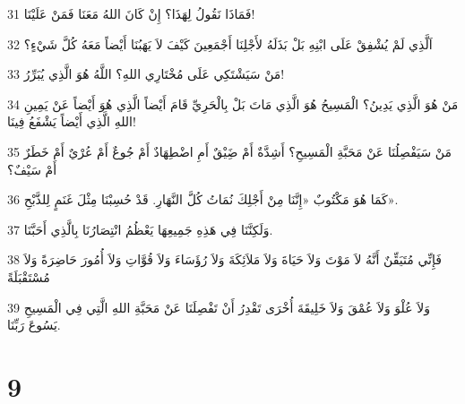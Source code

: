 \par 31 فَمَاذَا نَقُولُ لِهَذَا؟ إِنْ كَانَ اللهُ مَعَنَا فَمَنْ عَلَيْنَا!
\par 32 اَلَّذِي لَمْ يُشْفِقْ عَلَى ابْنِهِ بَلْ بَذَلَهُ لأَجْلِنَا أَجْمَعِينَ كَيْفَ لاَ يَهَبُنَا أَيْضاً مَعَهُ كُلَّ شَيْءٍ؟
\par 33 مَنْ سَيَشْتَكِي عَلَى مُخْتَارِي اللهِ؟ اللَّهُ هُوَ الَّذِي يُبَرِّرُ!
\par 34 مَنْ هُوَ الَّذِي يَدِينُ؟ الْمَسِيحُ هُوَ الَّذِي مَاتَ بَلْ بِالْحَرِيِّ قَامَ أَيْضاً الَّذِي هُوَ أَيْضاً عَنْ يَمِينِ اللهِ الَّذِي أَيْضاً يَشْفَعُ فِينَا!
\par 35 مَنْ سَيَفْصِلُنَا عَنْ مَحَبَّةِ الْمَسِيحِ؟ أَشِدَّةٌ أَمْ ضَِيْقٌ أَمِ اضْطِهَادٌ أَمْ جُوعٌ أَمْ عُرْيٌ أَمْ خَطَرٌ أَمْ سَيْفٌ؟
\par 36 كَمَا هُوَ مَكْتُوبٌ «إِنَّنَا مِنْ أَجْلِكَ نُمَاتُ كُلَّ النَّهَارِ. قَدْ حُسِبْنَا مِثْلَ غَنَمٍ لِلذَّبْحِ».
\par 37 وَلَكِنَّنَا فِي هَذِهِ جَمِيعِهَا يَعْظُمُ انْتِصَارُنَا بِالَّذِي أَحَبَّنَا.
\par 38 فَإِنِّي مُتَيَقِّنٌ أَنَّهُ لاَ مَوْتَ وَلاَ حَيَاةَ وَلاَ مَلاَئِكَةَ وَلاَ رُؤَسَاءَ وَلاَ قُوَّاتِ وَلاَ أُمُورَ حَاضِرَةً وَلاَ مُسْتَقْبَلَةً
\par 39 وَلاَ عُلْوَ وَلاَ عُمْقَ وَلاَ خَلِيقَةَ أُخْرَى تَقْدِرُ أَنْ تَفْصِلَنَا عَنْ مَحَبَّةِ اللهِ الَّتِي فِي الْمَسِيحِ يَسُوعَ رَبِّنَا.

\chapter{9}

